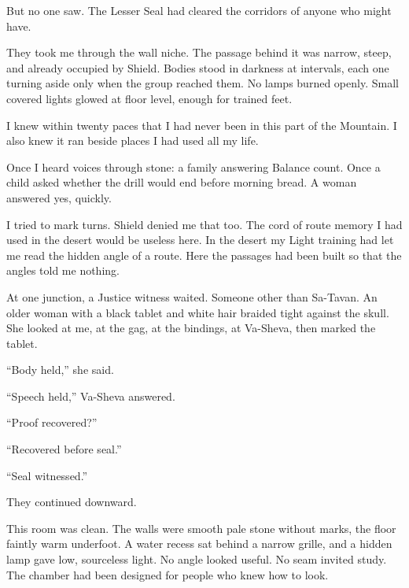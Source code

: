 But no one saw. The Lesser Seal had cleared the corridors of anyone who might have.\par

They took me through the wall niche. The passage behind it was narrow, steep, and already occupied by Shield. Bodies stood in darkness at intervals, each one turning aside only when the group reached them. No lamps burned openly. Small covered lights glowed at floor level, enough for trained feet.\par

I knew within twenty paces that I had never been in this part of the Mountain. I also knew it ran beside places I had used all my life.\par

Once I heard voices through stone: a family answering Balance count. Once a child asked whether the drill would end before morning bread. A woman answered yes, quickly.\par

I tried to mark turns. Shield denied me that too. The cord of route memory I had used in the desert would be useless here. In the desert my Light training had let me read the hidden angle of a route. Here the passages had been built so that the angles told me nothing.\par

At one junction, a Justice witness waited. Someone other than Sa-Tavan. An older woman with a black tablet and white hair braided tight against the skull. She looked at me, at the gag, at the bindings, at Va-Sheva, then marked the tablet.\par

``Body held,'' she said.\par

``Speech held,'' Va-Sheva answered.\par

``Proof recovered?''\par

``Recovered before seal.''\par

``Seal witnessed.''\par

They continued downward.\par

This room was clean. The walls were smooth pale stone without marks, the floor faintly warm underfoot. A water recess sat behind a narrow grille, and a hidden lamp gave low, sourceless light. No angle looked useful. No seam invited study. The chamber had been designed for people who knew how to look.\par

